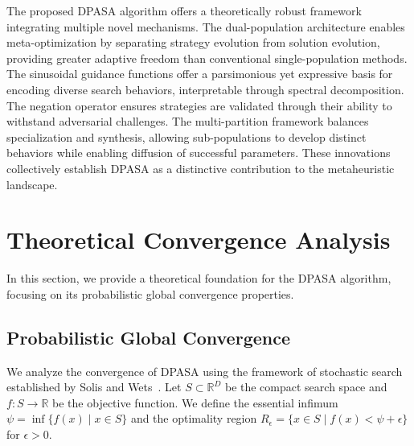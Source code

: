 \documentclass[11pt]{article}
\begin{document}
The proposed DPASA algorithm offers a theoretically robust framework integrating multiple novel mechanisms. The dual-population architecture enables meta-optimization by separating strategy evolution from solution evolution, providing greater adaptive freedom than conventional single-population methods. The sinusoidal guidance functions offer a parsimonious yet expressive basis for encoding diverse search behaviors, interpretable through spectral decomposition. The negation operator ensures strategies are validated through their ability to withstand adversarial challenges. The multi-partition framework balances specialization and synthesis, allowing sub-populations to develop distinct behaviors while enabling diffusion of successful parameters. These innovations collectively establish DPASA as a distinctive contribution to the metaheuristic landscape.



\section{Theoretical Convergence Analysis}
\label{sec:theoretical_analysis}

In this section, we provide a theoretical foundation for the DPASA algorithm, focusing on its probabilistic global convergence properties.

\subsection{Probabilistic Global Convergence}
\label{sec:convergence_proof}

We analyze the convergence of DPASA using the framework of stochastic search established by Solis and Wets~\citep{solis1981minimization}. Let $S \subset \mathbb{R}^D$ be the compact search space and $f: S \to \mathbb{R}$ be the objective function. We define the essential infimum $\psi = \inf \{f(x) \mid x \in S \}$ and the optimality region $R_\epsilon = \{x \in S \mid f(x) < \psi + \epsilon \}$ for $\epsilon > 0$.
\end{document}
